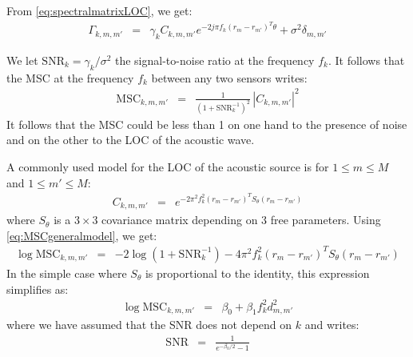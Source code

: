 \documentclass[a4paper, 12pt]{report}
\def\SNR{\mathrm{SNR}}
\def\MSC{\mathrm{MSC}}
\begin{document}
From \eqref{eq:spectralmatrixLOC}, we get:
\begin{eqnarray*}
 \Gamma_{k,m,m'}&=& \gamma_{k}C_{k,m,m'}e^{-2j\pi f_{k} (r_{m}-r_{m'})^{T}\theta }+\sigma^{2}\delta_{m,m'}
\end{eqnarray*}


We let $\SNR_{k}=\gamma_{k}/\sigma^2$ the signal-to-noise ratio at the frequency $f_{k}$. It follows that the MSC at the frequency $f_{k}$  between any two sensors writes:
\begin{eqnarray}
\label{eq:MSCgeneralmodel}
 \MSC_{k,m,m'}&=& \frac{1}{(1+\SNR_{k}^{-1})^2}\,|C_{k,m,m'}|^{2}
\end{eqnarray}
It follows that the MSC could be less than 1 on one hand to the presence of noise and on the other to the LOC of the acoustic wave.


A commonly used model for the LOC of the acoustic source is for $1\leq m\leq M$ and $1\leq m'\leq M$:
\begin{eqnarray}
 \label{eq:CkwithGauss}
 C_{k,m,m'} &=&e^{-2\pi^2f_k^2(r_{m}-r_{m'})^TS_{\theta}(r_{m}-r_{m'})}
\end{eqnarray}
where $S_{\theta}$ is a $3\times 3$ covariance matrix depending on 3 free parameters. Using \eqref{eq:MSCgeneralmodel}, we get:
\begin{eqnarray}
\label{eq:MSCgaussianmodelwithnoise}
 \log \MSC_{k,m,m'}&=& -2 \log(1+\SNR_{k}^{-1})
-4\pi^2f_k^2(r_{m}-r_{m'})^TS_{\theta}(r_{m}-r_{m'})
\end{eqnarray}
In the simple case where $S_{\theta}$ is proportional to the identity, this expression simplifies as:
\begin{eqnarray}
\label{eq:logMSCgaussianmodel}
 \log \MSC_{k,m,m'}&=& \beta_{0}+\beta_{1} f_k^2 d_{m,m'}^2
\end{eqnarray}
where we have assumed that the SNR does not depend on $k$ and writes:
\begin{eqnarray*}
 \SNR&=&\frac{1}{e^{- \beta_{0}/2}-1}
\end{eqnarray*}
\end{document}
